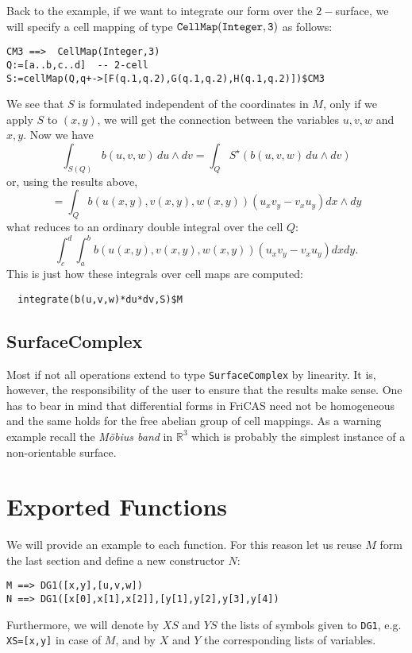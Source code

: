 \documentclass[12pt,a4paper]{article}
\newcommand{\RR}[1]{\mathbb{R}^{#1}}
\begin{document}
Back to the example, if we want to integrate our form over the $2-$surface,
we will specify a cell mapping of type $\tt CellMap(Integer,3)$ as
follows:
\begin{lstlisting}
CM3 ==>  CellMap(Integer,3)
Q:=[a..b,c..d]  -- 2-cell
S:=cellMap(Q,q+->[F(q.1,q.2),G(q.1,q.2),H(q.1,q.2)])$CM3
\end{lstlisting}
We see that $S$ is formulated independent of the coordinates in $M$,
only if we apply $S$ to $(x,y)$, we will get the connection between
the variables $u,v,w$ and $x,y$. Now we have 
\begin{displaymath}
   \int_{S(Q)} b(u,v,w)\,du\wedge dv = \int_{Q} S^{\star}(b(u,v,w)\,du\wedge dv)
\end{displaymath}
or, using the results above,
\begin{displaymath}
   = \int_{Q} b(u(x,y),v(x,y),w(x,y))  (u_x v_y - v_x u_y) dx\wedge dy
\end{displaymath}
what reduces to an ordinary double integral over the cell $Q$:
\begin{displaymath}
\int_c^d \int_a^b b(u(x,y),v(x,y),w(x,y))  (u_x v_y - v_x u_y) dx dy.
\end{displaymath}
This is just how these integrals over cell maps are computed:
\begin{lstlisting}
  integrate(b(u,v,w)*du*dv,S)$M
\end{lstlisting}
%
\subsection{SurfaceComplex}
Most if not all operations extend to type {\tt SurfaceComplex} by
linearity. It is, however, the responsibility of the user to ensure
that the results make sense. One has to bear in mind that differential
forms in FriCAS need not be homogeneous and the same holds for the free
abelian group of cell mappings. As a warning example recall 
the {\em M\"obius band} in $\RR 3$ which is probably the simplest
instance of a non-orientable surface.  
%
\section{Exported Functions}
We will provide an example to each function. For this reason let us reuse
$M$ form the last section and define a new constructor $N$: 
\begin{lstlisting}
M ==> DG1([x,y],[u,v,w])
N ==> DG1([x[0],x[1],x[2]],[y[1],y[2],y[3],y[4])
\end{lstlisting}
Furthermore, we will denote by $XS$ and $YS$ the lists of symbols
given to {\tt DG1}, e.g. {\tt XS=[x,y]} in case of $M$, and by
$X$ and $Y$ the corresponding lists of variables.
%
\end{document}
